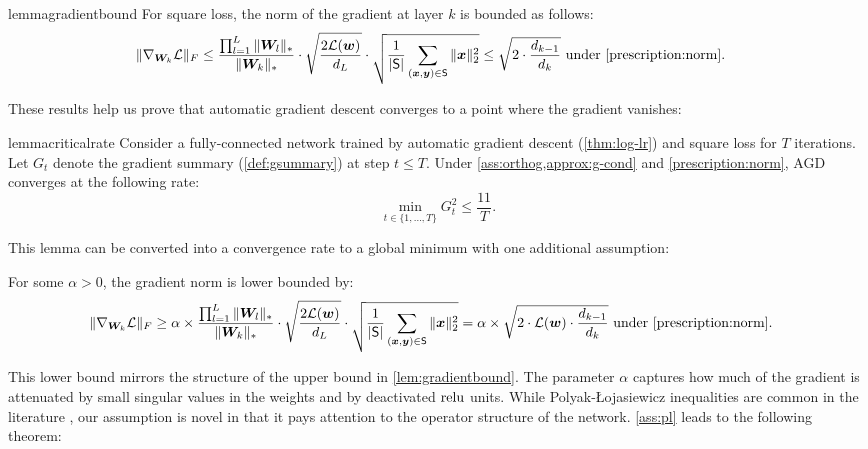 \begin{restatable}{lemma}{gradientbound}\label{lem:gradientbound}
For square loss, the norm of the gradient at layer $k$ is bounded as follows:
\begin{align*}
    \norm{\nabla_{\mW_k}\el}_F &\leq \frac{\prod_{l=1}^L\norm{\mW_l}_*}{\norm{\mW_k}_*} \cdot \sqrt{\frac{2\el(\vw)}{d_L}} \cdot \sqrt{\frac{1}{\abs{\set{S}}} \sum_{(\vx,\vy)\in \set{S}}\norm{\vx}_2^2} \leq \sqrt{2\cdot\frac{d_{k-1}}{d_k}} \text{ under \cref{prescription:norm}.}
\end{align*}
\end{restatable}

These results help us prove that automatic gradient descent converges to a point where the gradient vanishes:

\begin{restatable}{lemma}{criticalrate}\label{lem:criticalrate}
Consider a fully-connected network trained by automatic gradient descent (\cref{thm:log-lr}) and square loss for $T$ iterations. Let $G_t$ denote the gradient summary (\cref{def:gsummary}) at step $t\leq T$. Under \cref{ass:orthog,approx:g-cond} and \cref{prescription:norm}, AGD converges at the following rate:\vspace{-0.5em}
\begin{equation*}
    \min_{t\in\{1,...,T\}} G_t^2 \leq \frac{11}{T}.
\end{equation*}
\end{restatable}

This lemma can be converted into a convergence rate to a global minimum with one additional assumption:

\begin{assumption} \label{ass:pl}
For some $\alpha>0$, the gradient norm is lower bounded by:
\begin{align*}
    \norm{\nabla_{\mW_k}\el}_F &\geq \alpha \times \frac{\prod_{l=1}^L\norm{\mW_l}_*}{\norm{\mW_k}_*} \cdot \sqrt{\frac{2\el(\vw)}{d_L}} \cdot \sqrt{\frac{1}{\abs{\set{S}}} \sum_{(\vx,\vy)\in \set{S}}\norm{\vx}_2^2} = \alpha \times \sqrt{2\cdot\el(\vw)\cdot\frac{d_{k-1}}{d_k}} \text{ under \cref{prescription:norm}.}
\end{align*}
\end{assumption}
This lower bound mirrors the structure of the upper bound in \cref{lem:gradientbound}. The parameter $\alpha$ captures how much of the gradient is attenuated by small singular values in the weights and by deactivated $\operatorname{relu}$ units. While Polyak-Łojasiewicz inequalities are common in the literature \citep{LIU202285}, our assumption is novel in that it pays attention to the operator structure of the network. \cref{ass:pl} leads to the following theorem:

